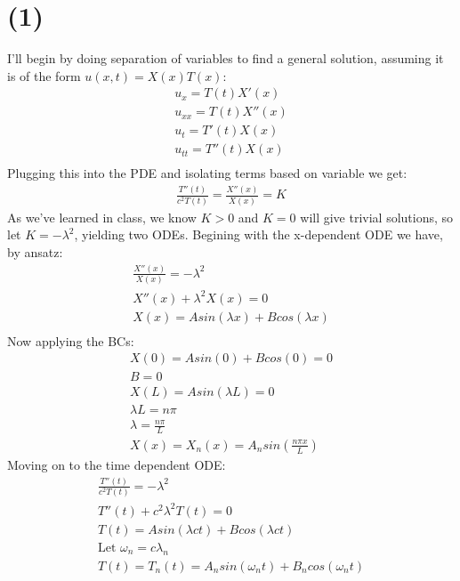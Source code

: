 \documentclass{article}
\begin{document}
\section*{\textbf{(1)}}
I'll begin by doing separation of variables to find a general solution, assuming it is of the form $u(x,t) = X(x)T(x)$:
\begin{equation}
\begin{aligned}
u_x = T(t)X'(x)\\
u_{xx} = T(t)X''(x)\\
u_t = T'(t)X(x)\\
u_{tt} = T''(t)X(x)\\
\end{aligned}
\end{equation}
Plugging this into the PDE and isolating terms based on variable we get:
\begin{equation}
\begin{aligned}
\frac{T''(t)}{c^2T(t)} = \frac{X''(x)}{X(x)} = K
\end{aligned}
\end{equation}
As we've learned in class, we know $K>0$ and $K=0$ will give trivial solutions, so let $K = -\lambda^2$, yielding two ODEs. Begining with the x-dependent ODE we have, by ansatz:
\begin{equation}
\begin{aligned}
\frac{X''(x)}{X(x)} = -\lambda^2\\
X''(x) + \lambda^2X(x) = 0\\
X(x) = Asin(\lambda x) + Bcos(\lambda x)\\
\end{aligned}
\end{equation}
Now applying the BCs:
\begin{equation}
\begin{aligned}
X(0) = Asin(0) + Bcos(0) = 0\\
B = 0\\
X(L) = Asin(\lambda L) = 0\\
\lambda L = n\pi \\
\lambda = \frac{n\pi}{L}\\
X(x) = X_n(x) = A_nsin(\frac{n\pi x}{L})
\end{aligned}
\end{equation}
Moving on to the time dependent ODE:
\begin{equation}
\begin{aligned}
\frac{T''(t)}{c^2T(t)}= -\lambda^2\\
T''(t) + c^2\lambda^2 T(t) = 0\\
T(t) = Asin(\lambda ct) + Bcos(\lambda ct)\\
\text{Let $\omega_n = c\lambda_n$}\\
T(t) = T_n(t) = A_nsin(\omega_n t) + B_ncos(\omega_n t)
\end{aligned}
\end{equation}
\end{document}
